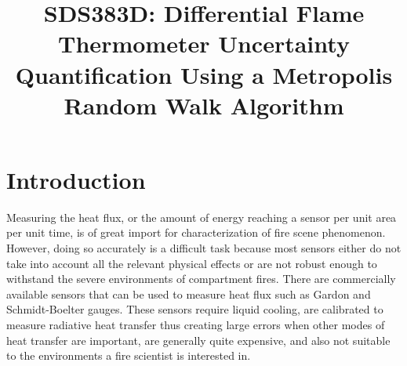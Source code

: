 \documentclass[article]{proc}
\begin{document}


\title{SDS383D: Differential Flame Thermometer Uncertainty Quantification Using a Metropolis Random Walk Algorithm}



\address[1]{Department of Mechanical Engineering, The University of Texas at Austin, Austin, TX 78712}




\maketitle
\section{Introduction}

    Measuring the heat flux, or the amount of energy reaching a sensor per unit area per unit time, is of great import for characterization of fire scene phenomenon. However, doing so accurately is a difficult task because most sensors either do not take into account all the relevant physical effects or are not robust enough to withstand the severe environments of compartment fires. There are commercially available sensors that can be used to measure heat flux such as Gardon and Schmidt-Boelter gauges. These sensors require liquid cooling, are calibrated to measure radiative heat transfer thus creating large errors when other modes of heat transfer are important, are generally quite expensive, and also not suitable to the environments a fire scientist is interested in. 
\end{document}
